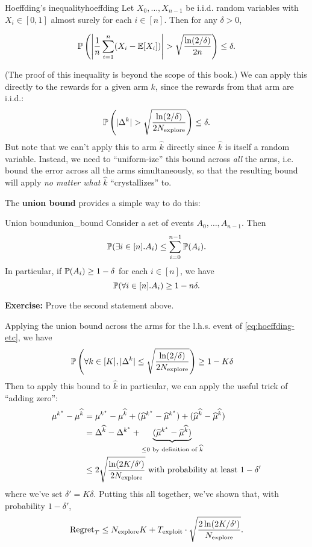 \documentclass[\main/main]{subfiles}
\begin{document}
\begin{theorem}{Hoeffding's inequality}{hoeffding}
    Let $X_0, \dots, X_{n-1}$ be i.i.d. random variables with $X_i \in [0, 1]$ almost surely for each $i \in [n]$. Then for any $\delta > 0$,

    \begin{equation}
        \P\left( \left| \frac{1}{n} \sum_{i=1}^n (X_i - \E[X_i]) \right| > \sqrt{\frac{\ln(2/\delta)}{2n}} \right) \le \delta.
    \end{equation}
\end{theorem}

(The proof of this inequality is beyond the scope of this book.) We can apply this directly to the rewards for a given arm $k$, since the rewards from that arm are i.i.d.:
\begin{equation}
    \P\left(|\Delta^k | > \sqrt{\frac{\ln(2/\delta)}{2\Nex}} \right) \le \delta. \label{eq:hoeffding-etc}
\end{equation}
But note that we can't apply this to arm $\hat k$ directly since $\hat k$ is itself a random variable. Instead, we need to ``uniform-ize'' this bound across \emph{all} the arms, i.e. bound the error across all the arms simultaneously, so that the resulting bound will apply \emph{no matter what} $\hat k$ ``crystallizes'' to.

The \textbf{union bound} provides a simple way to do this:

\begin{theorem}{Union bound}{union_bound}
    Consider a set of events $A_0, \dots, A_{n-1}$. Then \[
        \P(\exists i \in [n]. A_i) \le \sum_{i=0}^{n-1} \P(A_i).
    \]
    In particular, if $\P(A_i) \ge 1 - \delta$ for each $i \in [n]$, we have \[
        \P(\forall i \in [n]. A_i) \ge 1 - n \delta.
    \]
\end{theorem}

\textbf{Exercise:} Prove the second statement above.

Applying the union bound across the arms for the l.h.s. event of \ref*{eq:hoeffding-etc}, we have
\begin{align*}
    \P\left( \forall k \in [K], |\Delta^k | \le \sqrt{\frac{\ln(2/\delta)}{2\Nex}} \right) & \ge 1-K\delta
\end{align*}
Then to apply this bound to $\hat k$ in particular, we can apply the useful trick of ``adding zero'':
\begin{align*}
    \mu^{k^\star} - \mu^{\hat k} & = \mu^{k^\star} - \mu^{\hat k} + (\hat \mu^{k^\star} - \hat \mu^{k^\star}) + (\hat \mu^{\hat k} - \hat \mu^{\hat k})              \\
                                 & = \Delta^{\hat k} - \Delta^{k^*} + \underbrace{(\hat \mu^{k^\star} - \hat \mu^{\hat k})}_{\le 0 \text{ by definition of } \hat k} \\
                                 & \le 2 \sqrt{\frac{\ln(2K/\delta')}{2\Nex}} \text{ with probability at least } 1-\delta'
\end{align*}
where we've set $\delta' = K\delta$.
Putting this all together, we've shown that, with probability $1 - \delta'$,
\[
    \text{Regret}_T \le \Nex K + T_{\text{exploit}} \cdot \sqrt{\frac{2\ln(2K/\delta')}{\Nex}}.
\]
\end{document}
